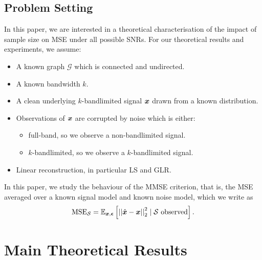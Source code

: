 \subsection{Problem Setting}
In this paper, we are interested in a theoretical characterisation of the impact of sample size on MSE under all possible SNRs. 
For our theoretical results and experiments, we assume:
\begin{itemize}
    \item A known graph $\mathcal{G}$ which is connected and undirected.
    \item A known bandwidth $k$.
    \item A clean underlying $k$-bandlimited signal $\bm{x}$ drawn from a known distribution.
    \item Observations of $\bm{x}$ are corrupted by noise which is either:
    \begin{itemize}
        \item full-band, so we observe a non-bandlimited signal.
        \item $k$-bandlimited, so we observe a $k$-bandlimited signal.
    \end{itemize}
    \item Linear reconstruction, in particular LS and GLR.
\end{itemize}
In this paper, we study the behaviour of the MMSE criterion, that is, the MSE averaged over a known signal model and known noise model, which we write as
\begin{equation}
    \textrm{MSE}_{\set{S}} = \expect[\vect{x},\vect{\epsilon}]{\sqnormvec{\hat{\vect{x}} - \vect{x}} \smallskip \mid \set{S} \textrm{ observed} }.
\end{equation}

\section{Main {\color{black}Theoretical} Results}
\label{main_results_sec}
